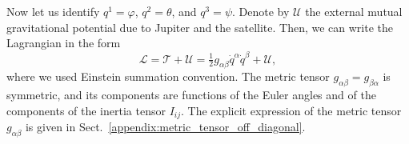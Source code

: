 \documentclass[pdflatex,sn-mathphys-num]{sn-jnl}%
\theoremstyle{thmstyleone}%
\theoremstyle{thmstyletwo}%
\theoremstyle{thmstylethree}%
\renewcommand{\vec}[1]{\boldsymbol{#1}}
\begin{document}

Now let us identify ${q^1 = \varphi}$, ${q^2 = \theta}$, and ${q^3 = \psi}$. %
Denote by $\mathcal{U}$ the external mutual gravitational potential due to Jupiter and the satellite. 
Then, we can write the Lagrangian  in the form %
%
\begin{equation}\label{eq:lagrangian_V2}
	\mathcal{L} =
	\mathcal{T} + \mathcal{U} =
	\tfrac{1}{2}	g_{\alpha\beta} \dot{q}^\alpha \dot{q}^\beta
	+ \mathcal{U},
\end{equation}
%
where we used Einstein summation convention. 
The metric tensor ${g_{\alpha\beta} = g_{\beta\alpha}}$ is symmetric, and its components  are functions of the Euler angles and of the components of the inertia tensor ${I}_{ij}$. The explicit expression of the metric tensor $g_{\alpha\beta}$ is given in Sect.~\ref{appendix:metric_tensor_off_diagonal}.
\end{document}
